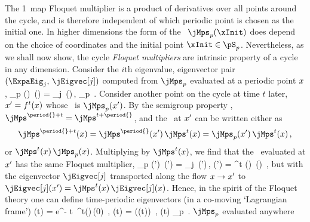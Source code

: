         { \label{exam:FloqTorus}
The 1\dmn\ map Floquet multiplier %
is a product of derivatives over all points around the cycle, and is
therefore independent of which periodic point is chosen as the
initial one.
In higher dimensions the form of the \FloquetM\
$\jMps_p(\xInit)$ %
does depend on the choice
of coordinates and the initial point $\xInit \in \pS_p$.
Nevertheless, as we shall now show, the cycle {\em Floquet
multipliers} are intrinsic property of a cycle in any
dimension. Consider the $i$th eigenvalue, eigen\-vector pair
$(\ExpaEig_{j},\, \jEigvec[j])$ computed from $\jMps_p$
evaluated at a periodic point $x$,
\beq
\jMps_p (\ssp) \,\jEigvec[j](\ssp) =
    \ExpaEig_{j} \,\jEigvec[j](\ssp)\,,  \quad
\ssp \in \pS_p \,.
Consider another point on the cycle at time $t$ later,
$x'=f^t(x)$ whose \FloquetM\ is $\jMps_{p} (\ssp')$.  By the
semigroup property \refeq{Jmultiplic},
$\jMps^{\period{}+t} = \jMps^{t+\period{}}$,
and the \jacobianM\ at $x'$ can be written either as
\[
\jMps^{\period{}+t} (\ssp) = \jMps^{\period{}} (\ssp') \, \jMps^{t} (\ssp)
               = \jMps_p (\ssp') \, \jMps^t (\ssp)
\,,
\]
or
$ %
  \jMps^t (\ssp) \, \jMps_p (\ssp)$.
Multiplying  by $\jMps^t (\ssp)$, we find that the
\FloquetM\ evaluated at $x'$ has the same Floquet multiplier,
\beq
\jMps_p (\ssp') \,\jEigvec[j](\ssp') =
    \ExpaEig_{j} \,\jEigvec[j](\ssp')\,,  \quad
     \jEigvec[j] (\ssp') = \jMps^t (\ssp) \,\jEigvec[j](\ssp)
\,,
but with the eigen\-vector $\jEigvec[j]$ transported along the flow
$x \to x'$ to $\jEigvec[j](\ssp')=\jMps^t(\ssp)
\,\jEigvec[j](\ssp)$. Hence, in the spirit of the Floquet theory
one can define time-periodic eigen\-vectors (in a
co-moving `Lagrangian frame')
\beq
\jEigvec[j](t) =
 e^{- \eigExp[j] t } \,\jMps^t(\ssp)\,\jEigvec[j](0)
    \,,\qquad
\jEigvec[j](t) = \jEigvec[j](\ssp(t))
    \,,\;\;
\ssp(t) \in \pS_p
\,.
$\jMps_p$ evaluated anywhere
}
